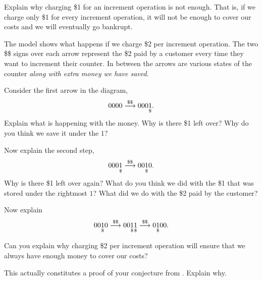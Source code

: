 \documentclass{tufte-handout}
\begin{document}
\begin{questions}
  \item Explain why charging \$1 for an increment operation is not
    enough.  That is, if we charge only \$1 for every increment
    operation, it will not be enough to cover our costs and we will
    eventually go bankrupt.
\end{questions}

The model shows what happens if we charge \$2 per increment
operation. The two \$\$ signs over each arrow represent the \$2 paid
by a customer every time they want to increment their counter.  In
between the arrows are various states of the counter \emph{along with
  extra money we have saved}.

\begin{questions}
  \item Consider the first arrow in the diagram, \[ 0000 \overset{\$\$}{\longrightarrow}
      000\underset{\$}{1}. \] Explain what is happening with the money.  Why is
    there \$1 left over? Why do you think we save it under the $1$?

  \item Now explain the second step, \[ 000\underset{\$}{1} \overset{\$\$}{\longrightarrow} 00\underset{\$}{1} 0. \] Why
    is there \$1 left over again?  What do you think we did with the
    \$1 that was stored under the rightmost $1$?  What did we do with
    the \$2 paid by the customer?

  \item Now explain \[ 00\underset{\$}{1} 0 \overset{\$\$}{\longrightarrow} 00\underset{\$}{1}\underset{\$}{1} \overset{\$\$}{\longrightarrow} 0\underset{\$}{1} 00. \]

  \item Can you explain why charging \$2 per increment operation will
    ensure that we always have enough money to cover our costs?

  \item This actually constitutes a proof of your conjecture from
    .  Explain why.
\end{questions}
\end{document}
